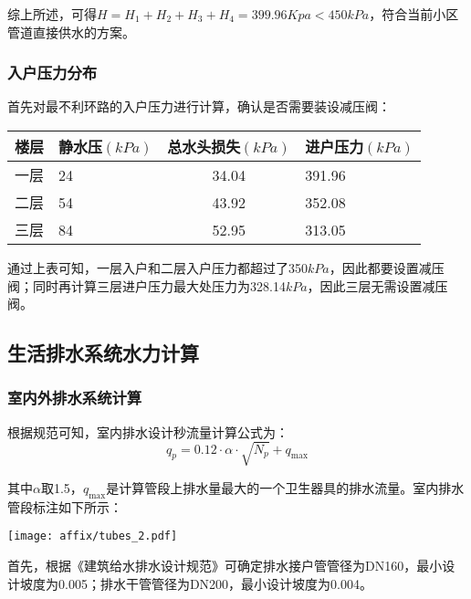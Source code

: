\documentclass{gdutart}
\begin{document}
        综上所述，可得$H = H_1 + H_2 + H_3 + H_4 = 399.96Kpa < 450kPa$，符合当前小区管道直接供水的方案。

      \subsubsection{入户压力分布}
        首先对最不利环路的入户压力进行计算，确认是否需要装设减压阀：
        \begin{center}
          \begin{tabularx}{\textwidth}{|Y|Y|c|Y|}
            \hline
            楼层 & 静水压$(kPa)$ & 总水头损失$(kPa)$ & 进户压力$(kPa)$ \\
            \hline
            一层 & 24  & 34.04 & 391.96 \\
            \hline
            二层 & 54  & 43.92 & 352.08 \\
            \hline
            三层 & 84  & 52.95 & 313.05 \\
            \hline
          \end{tabularx}
        \end{center}

        通过上表可知，一层入户和二层入户压力都超过了350$kPa$，因此都要设置减压阀；同时再计算三层进户压力最大处压力为328.14$kPa$，因此三层无需设置减压阀。
        \newpage

    \subsection{生活排水系统水力计算}
      \subsubsection{室内外排水系统计算}
        根据规范可知，室内排水设计秒流量计算公式为：
        \begin{equation}
          {q_p} = 0.12 \cdot \alpha  \cdot \sqrt {{N_p}}  + {q_{\max }}
        \end{equation}

        其中$\alpha$取1.5，$q_{\max}$是计算管段上排水量最大的一个卫生器具的排水流量。室内排水管段标注如下所示：
        \begin{center}
          \texttt{[image: affix/tubes\_2.pdf]}
        \end{center}

        首先，根据《建筑给水排水设计规范》可确定排水接户管管径为DN160，最小设计坡度为0.005；排水干管管径为DN200，最小设计坡度为0.004。
\end{document}
